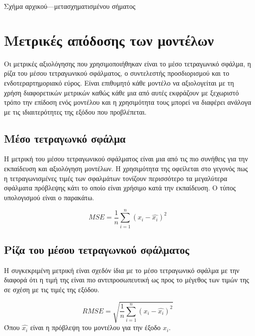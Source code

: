 Σχήμα αρχικού---μετασχηματισμένου σήματος

\section{Μετρικές απόδοσης των μοντέλων}
Οι μετρικές αξιολόγησης που χρησιμοποιήθηκαν είναι το μέσο τετραγωνικό σφάλμα, η ρίζα του μέσου τετραγωνικού σφάλματος, ο συντελεστής προσδιορισμού και το ενδοτεραρτημοριακό εύρος. Είναι επιθυμητό κάθε μοντέλο να αξιολογείται με τη χρήση διαφορετικών μετρικών καθώς κάθε μια από αυτές εκφράζουν με ξεχωριστό τρόπο την επίδοση ενός μοντέλου και η χρησιμότητα τους μπορεί να διαφέρει ανάλογα με τις ιδιαιτερότητες της εξόδου που προβλέπεται.

\subsection{Μέσο τετραγωνκό σφάλμα}
Η μετρική του μέσου τετραγωνικού σφάλματος είναι μια από τις πιο συνήθεις για την εκπαίδευση και αξιολόγηση μοντέλων. Η χρησιμότητα της οφείλεται στο γεγονός πως η τετραγωνισμένες τιμές των σφαλμάτων τονίζουν περισσότερο τα μεγαλύτερα σφάλματα πρόβλεψης κάτι το οποίο είναι χρήσιμο κατά την εκπαίδευση. Ο τύπος υπολογισμού είναι ο παρακάτω.

$$MSE=\frac{1}{n}\sum_{i=1}^{n} {\left(x_{i}-\hat{x_{i}}\right)}^2$$

\subsection{Ρίζα του μέσου τετραγωνκού σφάλματος}
Η συγκεκριμένη μετρική είναι σχεδόν ίδια με το μέσο τετραγωνικό σφάλμα με την διαφορά ότι η τιμή της είναι πιο αντιπροσωπευτική ως προς το μέγεθος των τιμών της σε σχέση με τις τιμές της εξόδου.

$$RMSE=\sqrt{\frac{1}{n}\sum_{i=1}^{n} {\left(x_{i}-\hat{x_{i}}\right)}^2}$$
Όπου $\hat{x_{i}}$ είναι η πρόβλεψη του μοντέλου για την έξοδο $x_i$.

